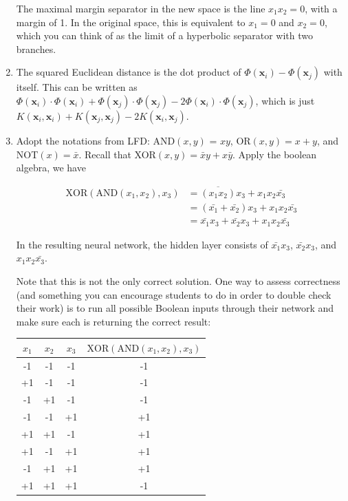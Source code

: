 \documentclass[10pt]{article}
\newcommand{\vecx}{\mathbf{x}}
\begin{document}
\begin{enumerate}
The maximal margin separator in the new space is the line $x_1 x_2 = 0$, with a margin of 1. 
In the original space, this is equivalent to $x_1 = 0$ and $x_2 = 0$, which you can think of as the limit of a hyperbolic separator with two branches.

\item The squared Euclidean distance is the dot product of $\Phi(\vecx_i)
  - \Phi(\vecx_j)$ with itself. This can be written as $\Phi(\vecx_i)
  \cdot \Phi(\vecx_i ) + \Phi(\vecx_j) \cdot \Phi(\vecx_j) - 2
  \Phi(\vecx_i) \cdot \Phi(\vecx_j)$, which is just $K(\vecx_i,
  \vecx_i) + K(\vecx_j, \vecx_j) - 2 K (\vecx_i, \vecx_j)$.

\item Adopt the notations from LFD: AND$(x,y)$ = $xy$, OR$(x,y)=x+y$, and NOT$(x)=\bar{x}$. Recall that XOR$(x,y) = \bar{x}y + x\bar{y}$.  Apply the boolean algebra, we have

\begin{align*}
\mbox{XOR}(\mbox{AND}(x_1,x_2), x_3 ) 
    &= \overline{(x_1 x_2)} x_3 + x_1 x_2 \bar{x_3} \\
    &= (\bar{x_1} + \bar{x_2}) x_3 + x_1 x_2 \bar{x_3} \\
    &= \bar{x_1}x_3 + \bar{x_2}x_3 + x_1 x_2 \bar{x_3}
\end{align*}

In the resulting neural network, the hidden layer consists of $\bar{x_1} x_3$, $\bar{x_2}x_3$, and $x_1 x_2 \bar{x_3}$.

Note that this is not the only correct solution.
One way to assess correctness (and something you can encourage students to do in order to double check their work) is to run all 
possible Boolean inputs through their network and make sure each is returning the correct result:
		  
  \begin{center}
	\begin{tabular}{c|c|c|c}
		$x_1$ & $x_2$ & $x_3$ & $\textrm{XOR}(\textrm{AND}(x_1,x_2),x_3)$ \\ \hline
		-1 & -1 & -1 & -1\\
		+1 & -1 & -1 & -1\\
		-1 & +1 & -1 & -1\\
		-1 & -1 & +1 & +1\\
		+1 & +1 & -1 & +1\\
		+1 & -1 & +1 & +1\\
		-1 & +1 & +1 & +1\\
		+1 & +1 & +1 & -1\\
	\end{tabular}
  \end{center}



\end{enumerate}
\end{document}
